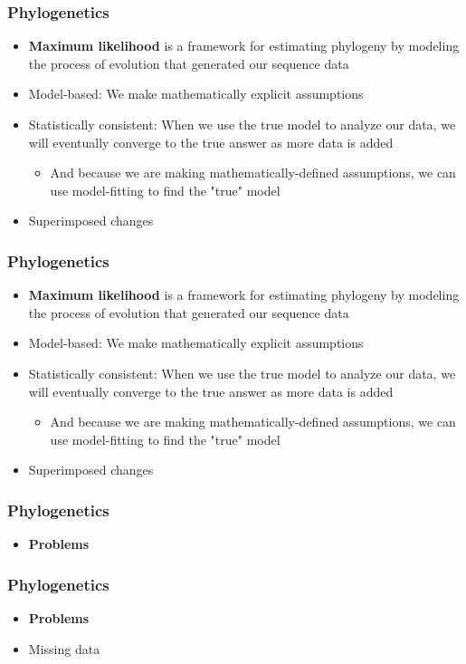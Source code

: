 \documentclass{beamer}
\begin{document}
\begin{frame}
\frametitle{Phylogenetics}
\begin{itemize}
\item \textbf{Maximum likelihood} is a framework for estimating phylogeny by modeling the process of evolution that generated our sequence data
\item Model-based: We make mathematically explicit assumptions 
\item Statistically consistent: When we use the true model to analyze our data, we will eventually converge to the true answer as more data is added
\begin{itemize}
\item And because we are making mathematically-defined assumptions, we can use model-fitting to find the "true" model
\end{itemize}
\item Superimposed changes
\end{itemize}
\end{frame}


\begin{frame}
\frametitle{Phylogenetics}
\begin{itemize}
\item \textbf{Maximum likelihood} is a framework for estimating phylogeny by modeling the process of evolution that generated our sequence data
\item Model-based: We make mathematically explicit assumptions 
\item Statistically consistent: When we use the true model to analyze our data, we will eventually converge to the true answer as more data is added
\begin{itemize}
\item And because we are making mathematically-defined assumptions, we can use model-fitting to find the "true" model
\end{itemize}
\item Superimposed changes
\end{itemize}
\end{frame}

\begin{frame}
\frametitle{Phylogenetics}
\begin{itemize}
\item \textbf{Problems}
\end{itemize}
\end{frame}

\begin{frame}
\frametitle{Phylogenetics}
\begin{itemize}
\item \textbf{Problems}
\item Missing data
\end{itemize}
\end{frame}
\end{document}

